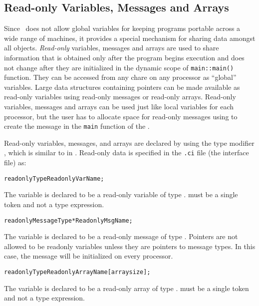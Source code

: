 \subsection{Read-only Variables, Messages and Arrays}

Since \charmpp\ does not allow global variables for keeping programs portable
across a wide range of machines, it provides a special mechanism for sharing
data amongst all objects. {\it Read-only} variables, messages and arrays are
used to share information that is obtained only after the program begins
execution and does not change after they are initialized in the dynamic scope
of {\tt main::main()} function. They can be accessed from any
chare on any processor as ``global'' variables. Large data
structures containing pointers can be made available as read-only variables
using read-only messages or read-only arrays. Read-only variables, messages and
arrays can be used just like local variables for each processor, but the user
has to allocate space for read-only messages using  to create the
message in the {\tt main} function of the . 

Read-only variables, messages, and arrays are declared by using the type
modifier , which is similar to  in \CC. Read-only data
is specified in the {\tt .ci} file (the interface file) as: 

\begin{alltt}
 readonly Type ReadonlyVarName;
\end{alltt}

The variable  is declared to be a read-only variable of
type .  must be a single token and not a type expression.

\begin{alltt}
 readonly MessageType *ReadonlyMsgName;
\end{alltt}

The variable  is declared to be a read-only message of type
. Pointers are not allowed to be readonly variables unless they
are pointers to message types. In this case, the message will be initialized on
every processor.

\begin{alltt}
 readonly Type ReadonlyArrayName [arraysize];
\end{alltt}

The variable  is declared to be a read-only array of type
.  must be a single token and not a type expression.

